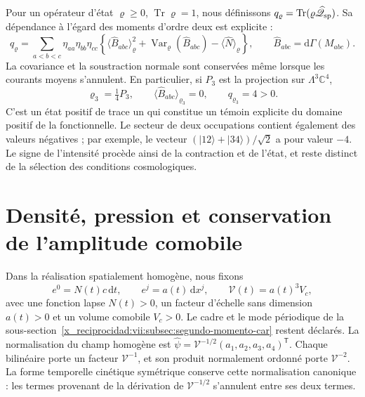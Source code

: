 Pour un opérateur d'état \(\varrho\geq0\),
\(\operatorname{Tr}\varrho=1\), nous définissons
\(q_\varrho=\operatorname{Tr}(\varrho\widehat{\mathscr Q}_{\rm sp})\).
Sa dépendance à l'égard des moments d'ordre deux est explicite :
\begin{equation}
 q_\varrho=\sum_{a<b<c}\eta_{aa}\eta_{bb}\eta_{cc}
 \left\{
  \langle\widehat B_{abc}\rangle_\varrho^2
  +\operatorname{Var}_\varrho(\widehat B_{abc})
  -\langle\widehat N\rangle_\varrho
 \right\},\qquad
 \widehat B_{abc}=\mathrm d\Gamma(M_{abc}).
 \label{x_reciprocidad:vii:eq:covarianza-espin-material}
\end{equation}
La covariance et la soustraction normale sont conservées même lorsque
les courants moyens s'annulent. En particulier, si \(P_3\) est la
projection sur \(\Lambda^3\mathbb C^4\),
\begin{equation}
 \varrho_3=\tfrac14P_3,\qquad
 \langle\widehat B_{abc}\rangle_{\varrho_3}=0,\qquad
 q_{\varrho_3}=4>0.
 \label{x_reciprocidad:vii:eq:testigo-positivo-espin}
\end{equation}
C'est un état positif de trace un qui constitue un témoin explicite
du domaine positif de la fonctionnelle. Le secteur de deux occupations
contient également des valeurs négatives ; par exemple, le vecteur
\((|12\rangle+|34\rangle)/\sqrt2\) a pour valeur \(-4\).
Le signe de l'intensité procède ainsi de la contraction et de
l'état, et reste distinct de la sélection des conditions cosmologiques.

\section{Densité, pression et conservation de l'amplitude comobile}
\label{x_reciprocidad:vii:subsec:amplitud-espinorial-comovil}

Dans la réalisation spatialement homogène, nous fixons
\[
 e^0=N(t)c\,\mathrm dt,\qquad e^j=a(t)\,\mathrm dx^j,
 \qquad \mathcal V(t)=a(t)^3V_c,
\]
avec une fonction lapse \(N(t)>0\), un facteur d'échelle sans dimension \(a(t)>0\)
et un volume comobile \(V_c>0\). Le cadre et le mode périodique de la
sous-section~\ref{x_reciprocidad:vii:subsec:segundo-momento-car} restent déclarés.
La normalisation du champ homogène est
\(\widehat\psi=\mathcal V^{-1/2}(a_1,a_2,a_3,a_4)^{\mathsf T}\).
Chaque bilinéaire porte un facteur \(\mathcal V^{-1}\), et son produit
normalement ordonné porte \(\mathcal V^{-2}\). La forme temporelle
cinétique symétrique conserve cette normalisation canonique : les termes
provenant de la dérivation de \(\mathcal V^{-1/2}\) s'annulent entre
ses deux termes.

